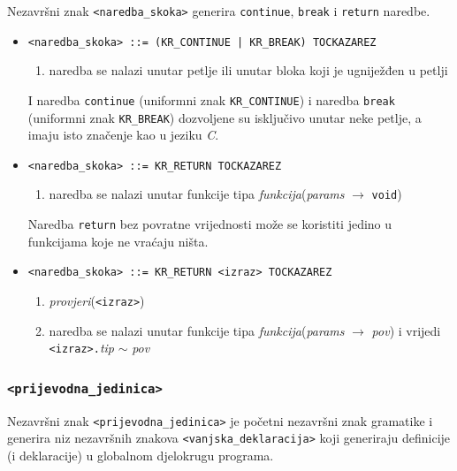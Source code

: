 \documentclass[times, 12pt, utf8]{book}
\begin{document}
Nezavršni znak \verb|<naredba_skoka>| generira \verb|continue|, \verb|break| i \verb|return| naredbe.

\begin{itemize}

\item
\verb#<naredba_skoka> ::= (KR_CONTINUE | KR_BREAK) TOCKAZAREZ#
\begin{enumerate}
\item
naredba se nalazi unutar petlje ili unutar bloka koji je ugniježđen u petlji
\end{enumerate}

I naredba \verb|continue| (uniformni znak \verb|KR_CONTINUE|) i naredba \verb|break| (uniformni znak \verb|KR_BREAK|) dozvoljene su isključivo unutar neke petlje, a imaju isto značenje kao u jeziku \emph{C}. 

\item
\verb#<naredba_skoka> ::= KR_RETURN TOCKAZAREZ#
\begin{enumerate}
\item
naredba se nalazi unutar funkcije tipa \emph{funkcija}(\emph{params} \(\to\) \verb|void|)
\end{enumerate}

Naredba \verb|return| bez povratne vrijednosti može se koristiti jedino u funkcijama koje ne vraćaju ništa.

\item
\verb#<naredba_skoka> ::= KR_RETURN <izraz> TOCKAZAREZ#
\begin{enumerate}
\item
\emph{provjeri}(\verb|<izraz>|)
\item
naredba se nalazi unutar funkcije tipa \emph{funkcija}(\emph{params} \(\to\) \emph{pov}) i vrijedi\\
\verb|<izraz>.|\emph{tip} \(\sim\) \emph{pov}
\end{enumerate}

\end{itemize}

\subsubsection{\texttt{<prijevodna\_jedinica>}}

Nezavršni znak \verb|<prijevodna_jedinica>| je početni nezavršni znak gramatike i generira niz nezavršnih znakova \verb|<vanjska_deklaracija>| koji generiraju definicije (i deklaracije) u globalnom djelokrugu programa.
\end{document}
